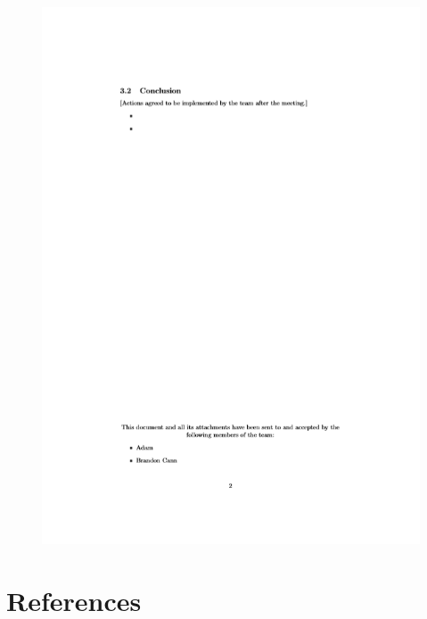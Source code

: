 \documentclass[12pt,a4paper]{article}
\begin{document}
\begin{figure}[h!]
	\centering
	\includegraphics[width=\textwidth]{Minute2.PNG}
\end{figure}
\pagebreak

\section{References}
\printbibliography
\end{document}
